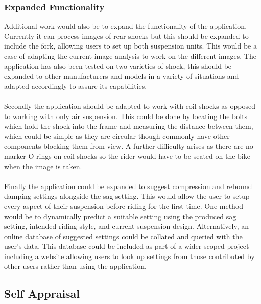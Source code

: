 		\subsubsection{Expanded Functionality}
			Additional work would also be to expand the functionality of the application. Currently it can process images of rear shocks but this should be expanded to include the fork, allowing users to set up both suspension units. This would be a case of adapting the current image analysis to work on the different images. The application has also been tested on two varieties of shock, this should be expanded to other manufacturers and models in a variety of situations and adapted accordingly to assure its capabilities.
			\\\\
			Secondly the application should be adapted to work with coil shocks as opposed to working with only air suspension. This could be done by locating the bolts which hold the shock into the frame and measuring the distance between them, which could be simple as they are circular though commonly have other components blocking them from view. A further difficulty arises as there are no marker O-rings on coil shocks so the rider would have to be seated on the bike when the image is taken.
			\\\\
			Finally the application could be expanded to suggest compression and rebound damping settings alongside the sag setting. This would allow the user to setup every aspect of their suspension before riding for the first time. One method would be to dynamically predict a suitable setting using the produced sag setting, intended riding style, and current suspension design. Alternatively, an online database of suggested settings could be collated and queried with the user's data. This database could be included as part of a wider scoped project including a website allowing users to look up settings from those contributed by other users rather than using the application.
	\subsection{Self Appraisal}
